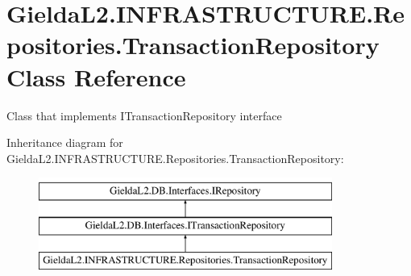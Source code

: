 \hypertarget{class_gielda_l2_1_1_i_n_f_r_a_s_t_r_u_c_t_u_r_e_1_1_repositories_1_1_transaction_repository}{}\section{Gielda\+L2.\+I\+N\+F\+R\+A\+S\+T\+R\+U\+C\+T\+U\+R\+E.\+Repositories.\+Transaction\+Repository Class Reference}
\label{class_gielda_l2_1_1_i_n_f_r_a_s_t_r_u_c_t_u_r_e_1_1_repositories_1_1_transaction_repository}


Class that implements I\+Transaction\+Repository interface  


Inheritance diagram for Gielda\+L2.\+I\+N\+F\+R\+A\+S\+T\+R\+U\+C\+T\+U\+R\+E.\+Repositories.\+Transaction\+Repository\+:\begin{figure}[H]
\begin{center}
\leavevmode
\includegraphics[height=3.000000cm]{class_gielda_l2_1_1_i_n_f_r_a_s_t_r_u_c_t_u_r_e_1_1_repositories_1_1_transaction_repository}
\end{center}
\end{figure}

